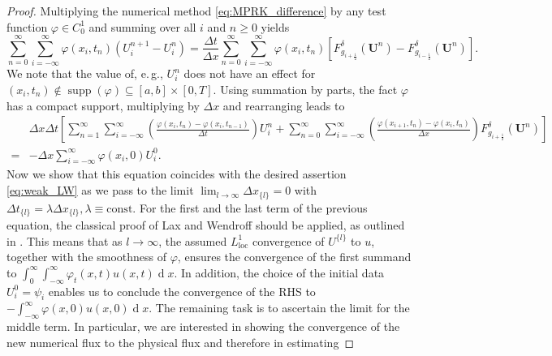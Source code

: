 \documentclass[final,11pt, times, linenumber, nopreprintline]{elsarticle}
\DeclareMathOperator\supp{supp}
\let\phi\varphi
\newcommand{\dx}{\operatorname{d}\!x}
\newcommand{\bU}{\bm U}
\begin{document}
\begin{proof}
Multiplying the numerical method \eqref{eq:MPRK_difference} by any test function  $\phi \in C_0^1$ and summing over all $i$ and $n\geq 0$ yields
	\begin{equation*}
		\sum_{n=0}^{\infty} \sum_{i=-\infty}^{\infty} \phi(x_i,t_n)(U_i^{n+1}-U_i^n)=\frac{\Delta t}{\Delta x} \sum_{n=0}^{\infty} \sum_{i=-\infty}^{\infty} \phi(x_i,t_n)\left[F^{\delta}_{g_{i+\frac{1}{2}}}(\bU^n)-F^{\delta}_{g_{i-\frac{1}{2}}}(\bU^n)\right].
	\end{equation*} We note that the value of, e.\,g., $U_i^n$ does not have an effect for $(x_i,t_n)\notin\supp(\phi)\subseteq[a,b]\times [0,T]$. Using summation by parts, the fact $\phi$ has a compact support, multiplying by $\Delta x$ and rearranging leads to
	\begin{equation}
    \begin{split}
		&\Delta x\Delta t\left[\sum_{n=1}^{\infty} \sum_{i=-\infty}^{\infty} \left(\frac{\phi(x_i,t_n)-\phi(x_i,t_{n-1})}{\Delta t}\right)U_i^n +\sum_{n=0}^{\infty}\sum_{i=-\infty}^{\infty}\left(\frac{\phi(x_{i+1},t_n)-\phi(x_i,t_n)}{\Delta x}\right)F^{\delta}_{g_{i+\frac{1}{2}}}(\bU^n)\right] \\
        =&-\Delta x\sum_{i=-\infty}^{\infty}\phi(x_i,0)U_i^0.
		\label{eq:disc_prf_lw}
        \end{split}
	\end{equation}
    Now we show that this equation coincides with the desired assertion \eqref{eq:weak_LW} as we pass to the limit $ \lim_{l{ \rightarrow \infty}} \Delta x_{\{l\}} = 0$ with $\Delta t_{\{l\}} = \lambda \Delta x_{\{l\}}, \lambda \equiv \mathrm{const}$. 
    For the first and the last term of the previous equation, the classical proof of Lax and Wendroff should be applied, as outlined in \cite{leveque_numerical_1992}. This means that as $l \rightarrow \infty$, the assumed $L^1_{\mathrm{loc}}$ convergence of $U^{\{l\}}$ to $u$, together with the smoothness of $\phi$, ensures the convergence of the first summand to $\int_0^\infty \int_{-\infty}^{\infty} \phi_t(x,t)u(x,t)\dx$. In addition, the choice of the initial data $U_i^0=\psi_i$ enables us to conclude the convergence of the RHS to $-\int_{-\infty}^{\infty} \phi(x,0)u(x,0)\dx$. %
	The remaining task is to ascertain the limit for the middle term. In particular, we are interested in showing the convergence of the new numerical flux to the physical flux and therefore in estimating 

\end{proof}
\end{document}

